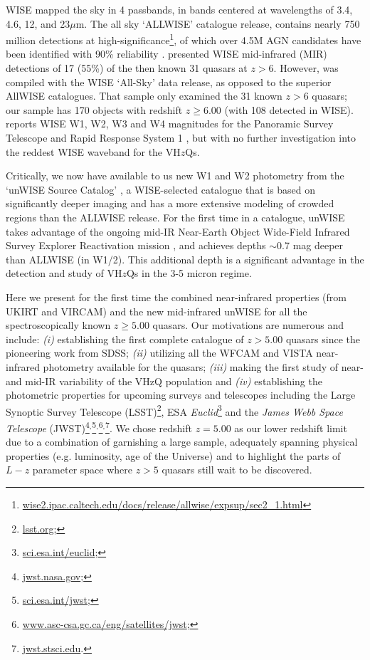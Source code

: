\documentclass[usenatbib]{mnras}
\begin{document}
WISE mapped the sky in 4 passbands, in bands centered at wavelengths
of 3.4, 4.6, 12, and 23$\mu$m. The all sky `ALLWISE' catalogue
release, contains nearly 750 million detections at
high-significance\footnote{\href{wise2.ipac.caltech.edu/docs/release/allwise/expsup/sec2\_1.html}{wise2.ipac.caltech.edu/docs/release/allwise/expsup/sec2\_1.html}},
of which over 4.5M AGN candidates have been identified with 90\%
reliability \citep{Assef2018}.  \citet{Blain2013} presented WISE
mid-infrared (MIR) detections of 17 (55\%) of the then known 31
quasars at $z > 6$. However, \citet{Blain2013} was compiled with the
WISE `All-Sky' data release, as opposed to the superior AllWISE
catalogues. That sample only examined the 31 known $z>6$ quasars; our
sample has 170 objects with redshift $z \geq 6.00$ (with 108 detected
in WISE). \citet{Banados2016} reports WISE W1, W2, W3 and W4
magnitudes for the Panoramic Survey Telescope and Rapid Response
System 1 \citep[Pan-STARRS1, PS1;][]{Kaiser2002, Kaiser2010}, but with
no further investigation into the reddest WISE waveband for the
VH$z$Qs.

Critically, we now have available to us new W1 and W2 photometry from the `unWISE Source Catalog' \citep[][]{Schlafly2019}, a WISE-selected catalogue that is based on significantly deeper imaging and has a more extensive modeling of crowded regions than the ALLWISE release. For the first time in a catalogue, unWISE takes advantage of the ongoing mid-IR Near-Earth Object Wide-Field Infrared Survey Explorer Reactivation mission \citep[NEOWISE-R; ][]{Mainzer2014}, and achieves depths $\sim$0.7 mag deeper than ALLWISE (in W1/2).  This additional depth is a significant advantage in the detection and study of VH$z$Qs in the 3-5 micron regime.

Here we present for the first time the combined near-infrared properties (from UKIRT and VIRCAM) and the new mid-infrared unWISE for
all the spectroscopically known $z\geq5.00$ quasars. Our motivations are numerous and include: {\it (i)} establishing the first complete
catalogue of $z>5.00$ quasars since the pioneering work from SDSS; {\it (ii)} utilizing all the WFCAM and VISTA near-infrared photometry
available for the quasars; {\it (iii)} making the first study of near- and mid-IR variability of the VHzQ population and {\it (iv)} establishing the photometric properties for upcoming surveys and telescopes including the Large Synoptic Survey Telescope (LSST)\footnote{\href{https://www.lsst.org}{lsst.org};}, ESA {\it Euclid}\footnote{\href{https://sci.esa.int/euclid/}{sci.esa.int/euclid};} and the {\it James Webb Space Telescope} (JWST)\footnote{\href{https://www.jwst.nasa.gov/}{jwst.nasa.gov};}$^,$\footnote{\href{https://sci.esa.int/jwst/}{sci.esa.int/jwst};}$^,$\footnote{\href{https://www.asc-csa.gc.ca/eng/satellites/jwst/}{www.asc-csa.gc.ca/eng/satellites/jwst};}$^,$\footnote{\href{https://jwst.stsci.edu/}{jwst.stsci.edu}.}. We chose redshift $z=5.00$ as our lower redshift limit due to a combination of garnishing a large sample, adequately spanning physical properties (e.g. luminosity, age of the Universe) and to highlight the parts of $L-z$ parameter space where $z>5$ quasars still wait to be discovered.
\end{document}
